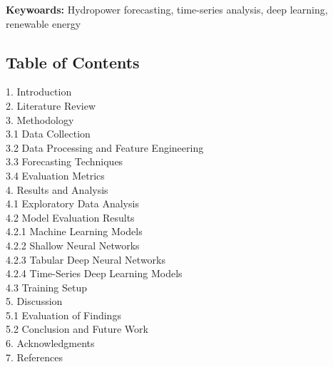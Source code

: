 \documentclass[12pt]{article}
\begin{document}
\textbf{Keywoards:} Hydropower forecasting, time-series analysis, deep learning, renewable energy

\newpage
\begin{center}
    \section*{Table of Contents}
\end{center}

\begin{flushleft}
1. Introduction \dotfill \pageref{sec:Introduction} \\
2. Literature Review \dotfill \pageref{sec:Literature Review} \\
3. Methodology \dotfill \pageref{sec:Methodology} \\
\hspace{1em}3.1 Data Collection \dotfill \pageref{sec:data} \\
\hspace{1em}3.2 Data Processing and Feature Engineering \dotfill \pageref{sec:features} \\
\hspace{1em}3.3 Forecasting Techniques \dotfill \pageref{sec:models} \\
\hspace{1em}3.4 Evaluation Metrics \dotfill \pageref{sec:metrics} \\
4. Results and Analysis \dotfill \pageref{sec:results} \\
\hspace{1em}4.1 Exploratory Data Analysis \dotfill \pageref{sec:eda} \\
\hspace{1em}4.2 Model Evaluation Results \dotfill \pageref{sec:ml} \\
\hspace{2em}4.2.1 Machine Learning Models \dotfill \pageref{sec:mlml} \\
\hspace{2em}4.2.2 Shallow Neural Networks \dotfill \pageref{sec:shallow} \\
\hspace{2em}4.2.3 Tabular Deep Neural Networks \dotfill \pageref{sec:tab} \\
\hspace{2em}4.2.4 Time-Series Deep Learning Models \dotfill \pageref{sec:ts} \\
\hspace{1em}4.3 Training Setup \dotfill \pageref{sec:train} \\
5. Discussion \dotfill \pageref{sec:discussion} \\
\hspace{1em}5.1 Evaluation of Findings \dotfill \pageref{sec:evaluation} \\
\hspace{1em}5.2 Conclusion and Future Work \dotfill 
\pageref{sec:limitations} \\
6. Acknowledgments \dotfill \pageref{sec:acknowledgments} \\
7. References \dotfill \pageref{sec:references} \\
\end{flushleft}
\end{document}
